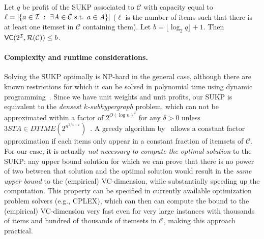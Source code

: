 \begin{corollary}\label{lem:sukpvc}
  Let $q$ be profit of the SUKP associated to $\mathcal{C}$ with capacity
  equal to $\ell=|\{a\in{\cal I} ~:~ \exists A\in\mathcal{C} \mbox{ s.t. } a\in
  A\}|$ ($\ell$ is the number of items such that there is at least one itemset in $\mathcal{C}$ containing
  them).
  Let $b=\lfloor\log_2 q\rfloor + 1$. Then
  $\mathsf{VC}(2^{\cal I},\mathcal{R}(\mathcal{C}))\le b$. %
\end{corollary}

\paragraph{Complexity and runtime considerations.} Solving the SUKP optimally is NP-hard in the general case, although there are
known restrictions for which it can be solved in polynomial time using dynamic
programming~\citep{GoldschmidtNY94}. Since we have unit weights and unit
profits, our SUKP is equivalent to the \emph{densest $k$-subhypergraph} problem,
which can not be approximated within a factor of $2^{O(\log n)^\delta}$ for any
$\delta>0$ unless $3STA \in
DTIME(2^{n^{3/4+\varepsilon}})$~\citep{HajiaghayiJKLMRSV06}. A greedy algorithm
by~\citet{Arulselvan14} allows a constant factor approximation if each
items only appear in a constant fraction of itemsets of $\mathcal{C}$. 
For our case, it is actually \emph{not necessary to compute the optimal
solution} to the SUKP: any upper bound solution for which we can prove that
there is no power of two between that solution and the optimal solution would
result in the \emph{same upper bound} to the (empirical) VC-dimension, while
substantially speeding up the computation. This property can be specified in
currently available optimization problem solvers (e.g., CPLEX), which can then
can compute the bound to the (empirical) VC-dimension very fast even for very
large instances with thousands of items and hundred of thousands of itemsets in
$\mathcal{C}$, making this approach practical. %

